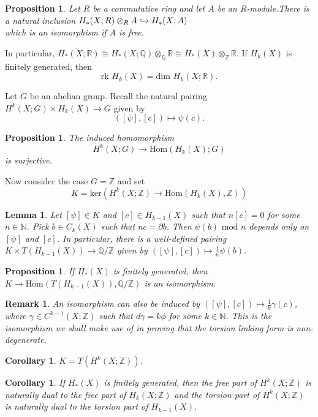 \documentclass{article}
\newtheorem{lemma}[theorem]{Lemma}
\newtheorem{proposition}[theorem]{Proposition}
\newtheorem{corollary}[theorem]{Corollary}
\newtheorem{remark}[theorem]{Remark}
\begin{document}
\begin{proposition}
Let $R$ be a commutative ring and let $A$ be an $R$-module.There is a natural inclusion $H_*(X;R)\otimes_RA\xhookrightarrow{}H_*(X;A)$\\
which is an isomorphism if $A$ is free.
\end{proposition}

In particular, $H_*(X;\mathbb{R})\cong H_*(X;\mathbb{Q})\otimes_\mathbb{Q}\mathbb{R}\cong H_*(X)\otimes_\mathbb{Z}\mathbb{R}$. If $H_k(X)$ is finitely generated, then \[\text{rk }H_k(X)=\text{dim }H_k(X;\mathbb{R}).\]

\noindent Let $G$ be an abelian group. Recall the natural pairing $H^k(X;G)\times H_k(X)\to G$ given by \[([\psi],[c])\mapsto\psi(c).\]

\begin{proposition}
The induced homomorphism \[H^k(X;G)\to\text{Hom}(H_k(X);G)\]is surjective.
\end{proposition}
\noindent Now consider the case $G=\mathbb{Z}$ and set\[K=\text{ker}(H^k(X;\mathbb{Z})\to\text{Hom}(H_k(X),\mathbb{Z}))\]
\begin{lemma}
Let $[\psi]\in K$ and $[c]\in H_{k-1}(X)$ such that $n[c]=0$ for some $n\in\mathbb{N}$. Pick $b\in C_k(X)$ such that $nc=\partial b$. Then $\psi(b)\text{ mod }n$ depends only on $[\psi]$ and $[c]$.
In particular, there is a well-defined pairing $K\times T(H_{k-1}(X))\to\mathbb{Q}/\mathbb{Z}$ given by $([\psi],[c])\mapsto\frac{1}{n}\psi(b)$.
\end{lemma}

\begin{proposition}
If $H_*(X)$ is finitely generated, then $K\to\text{Hom}(T(H_{k-1}(X)),\mathbb{Q}/\mathbb{Z})$ is an isomorphism.
\end{proposition}

\begin{remark}
An isomorphism can also be induced by $([\psi],[c])\mapsto\frac{1}{k}\gamma(c)$, where $\gamma\in C^{k-1}(X;\mathbb{Z})$ such that $d\gamma=k\phi$ for some $k\in\mathbb{N}$. This is the isomorphism we shall make use of in proving that the torsion linking form is non-degenerate.
\end{remark}

\begin{corollary}
$K=T(H^k(X;\mathbb{Z}))$.
\end{corollary}
\begin{corollary}
If $H_*(X)$ is finitely generated, then the free part of $H^k(X;\mathbb{Z})$ is naturally dual to the free part of $H_k(X;\mathbb{Z})$ and the torsion part of $H^k(X;\mathbb{Z})$ is naturally dual to the torsion part of $H_{k-1}(X)$.
\end{corollary}
\end{document}
